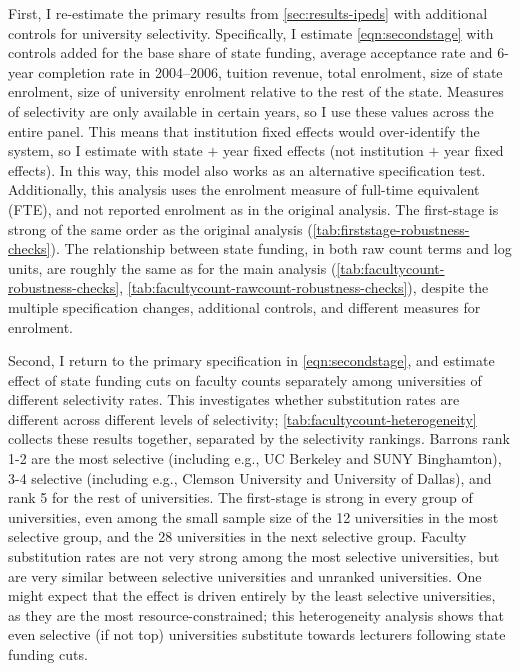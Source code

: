 First, I re-estimate the primary results from \autoref{sec:results-ipeds} with additional controls for university selectivity.
Specifically, I estimate \autoref{eqn:secondstage} with controls added for the base share of state funding, average acceptance rate and 6-year completion rate  in 2004--2006, tuition revenue, total enrolment, size of state enrolment, size of university enrolment relative to the rest of the state.
Measures of selectivity are only available in certain years, so I use these values across the entire panel.
This means that institution fixed effects would over-identify the system, so I estimate with state $+$ year fixed effects (not institution $+$ year fixed effects).
In this way, this model also works as an alternative specification test.
Additionally, this analysis uses the enrolment measure of full-time equivalent (FTE), and not reported enrolment as in the original analysis.
The first-stage is strong of the same order as the original analysis (\autoref{tab:firststage-robustness-checks}).
The relationship between state funding, in both raw count terms and log units, are roughly the same as for the main analysis (\autoref{tab:facultycount-robustness-checks}, \ref{tab:facultycount-rawcount-robustness-checks}), despite the multiple specification changes, additional controls, and different measures for enrolment.

Second, I return to the primary specification in \autoref{eqn:secondstage}, and estimate effect of state funding cuts on faculty counts separately among universities of different selectivity rates.
This investigates whether substitution rates are different across different levels of selectivity; \autoref{tab:facultycount-heterogeneity} collects these results together, separated by the \cite{barrons2009} selectivity rankings.
Barrons rank 1-2 are the most selective (including e.g., UC Berkeley and SUNY Binghamton), 3-4 selective (including e.g., Clemson University and University of Dallas), and rank 5 for the rest of universities.
The first-stage is strong in every group of universities, even among the small sample size of the 12 universities in the most selective group, and the 28 universities in the next selective group.
Faculty substitution rates are not very strong among the most selective universities, but are very similar between selective universities and unranked universities.
One might expect that the effect is driven entirely by the least selective universities, as they are the most resource-constrained;
this heterogeneity analysis shows that even selective (if not top) universities substitute towards lecturers following state funding cuts.

